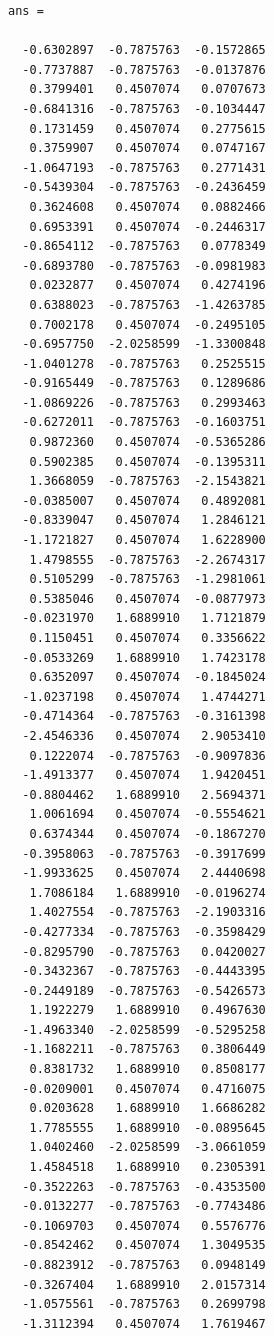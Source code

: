 \documentclass[11pt]{article}
\begin{document}
    \begin{Verbatim}[commandchars=\\\{\}]
ans =

  -0.6302897  -0.7875763  -0.1572865
  -0.7737887  -0.7875763  -0.0137876
   0.3799401   0.4507074   0.0707673
  -0.6841316  -0.7875763  -0.1034447
   0.1731459   0.4507074   0.2775615
   0.3759907   0.4507074   0.0747167
  -1.0647193  -0.7875763   0.2771431
  -0.5439304  -0.7875763  -0.2436459
   0.3624608   0.4507074   0.0882466
   0.6953391   0.4507074  -0.2446317
  -0.8654112  -0.7875763   0.0778349
  -0.6893780  -0.7875763  -0.0981983
   0.0232877   0.4507074   0.4274196
   0.6388023  -0.7875763  -1.4263785
   0.7002178   0.4507074  -0.2495105
  -0.6957750  -2.0258599  -1.3300848
  -1.0401278  -0.7875763   0.2525515
  -0.9165449  -0.7875763   0.1289686
  -1.0869226  -0.7875763   0.2993463
  -0.6272011  -0.7875763  -0.1603751
   0.9872360   0.4507074  -0.5365286
   0.5902385   0.4507074  -0.1395311
   1.3668059  -0.7875763  -2.1543821
  -0.0385007   0.4507074   0.4892081
  -0.8339047   0.4507074   1.2846121
  -1.1721827   0.4507074   1.6228900
   1.4798555  -0.7875763  -2.2674317
   0.5105299  -0.7875763  -1.2981061
   0.5385046   0.4507074  -0.0877973
  -0.0231970   1.6889910   1.7121879
   0.1150451   0.4507074   0.3356622
  -0.0533269   1.6889910   1.7423178
   0.6352097   0.4507074  -0.1845024
  -1.0237198   0.4507074   1.4744271
  -0.4714364  -0.7875763  -0.3161398
  -2.4546336   0.4507074   2.9053410
   0.1222074  -0.7875763  -0.9097836
  -1.4913377   0.4507074   1.9420451
  -0.8804462   1.6889910   2.5694371
   1.0061694   0.4507074  -0.5554621
   0.6374344   0.4507074  -0.1867270
  -0.3958063  -0.7875763  -0.3917699
  -1.9933625   0.4507074   2.4440698
   1.7086184   1.6889910  -0.0196274
   1.4027554  -0.7875763  -2.1903316
  -0.4277334  -0.7875763  -0.3598429
  -0.8295790  -0.7875763   0.0420027
  -0.3432367  -0.7875763  -0.4443395
  -0.2449189  -0.7875763  -0.5426573
   1.1922279   1.6889910   0.4967630
  -1.4963340  -2.0258599  -0.5295258
  -1.1682211  -0.7875763   0.3806449
   0.8381732   1.6889910   0.8508177
  -0.0209001   0.4507074   0.4716075
   0.0203628   1.6889910   1.6686282
   1.7785555   1.6889910  -0.0895645
   1.0402460  -2.0258599  -3.0661059
   1.4584518   1.6889910   0.2305391
  -0.3522263  -0.7875763  -0.4353500
  -0.0132277  -0.7875763  -0.7743486
  -0.1069703   0.4507074   0.5576776
  -0.8542462   0.4507074   1.3049535
  -0.8823912  -0.7875763   0.0948149
  -0.3267404   1.6889910   2.0157314
  -1.0575561  -0.7875763   0.2699798
  -1.3112394   0.4507074   1.7619467

\end{Verbatim}
\end{document}
